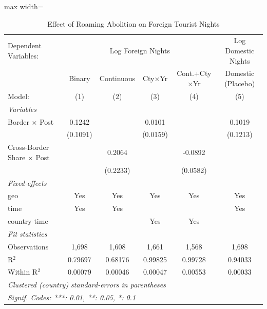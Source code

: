
\begin{table}[htbp]
   \caption{\label{tab:main_results} Effect of Roaming Abolition on Foreign Tourist Nights}
   \centering
   \begin{adjustbox}{max width=\textwidth}
\begin{tabular}{lccccc}
      \tabularnewline \midrule \midrule
      Dependent Variables: & \multicolumn{4}{c}{Log Foreign Nights} & Log Domestic Nights\\
                                        & Binary   & Continuous & Cty$\times$Yr  & Cont.+Cty$\times$Yr  & Domestic (Placebo) \\   
      Model:                            & (1)      & (2)        & (3)            & (4)                  & (5)\\  
      \midrule
      \emph{Variables}\\
      Border $\times$ Post              & 0.1242   &            & 0.0101         &                      & 0.1019\\   
                                        & (0.1091) &            & (0.0159)       &                      & (0.1213)\\   
      Cross-Border Share $\times$ Post  &          & 0.2064     &                & -0.0892              &   \\   
                                        &          & (0.2233)   &                & (0.0582)             &   \\   
      \midrule
      \emph{Fixed-effects}\\
      geo                               & Yes      & Yes        & Yes            & Yes                  & Yes\\  
      time                              & Yes      & Yes        &                &                      & Yes\\  
      country-time                      &          &            & Yes            & Yes                  & \\  
      \midrule
      \emph{Fit statistics}\\
      Observations                      & 1,698    & 1,608      & 1,661          & 1,568                & 1,698\\  
      R$^2$                             & 0.79697  & 0.68176    & 0.99825        & 0.99728              & 0.94033\\  
      Within R$^2$                      & 0.00079  & 0.00046    & 0.00047        & 0.00553              & 0.00033\\  
      \midrule \midrule
      \multicolumn{6}{l}{\emph{Clustered (country) standard-errors in parentheses}}\\
      \multicolumn{6}{l}{\emph{Signif. Codes: ***: 0.01, **: 0.05, *: 0.1}}\\
   \end{tabular}
\end{adjustbox}
   

\end{table}
